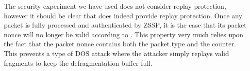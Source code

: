 \documentclass{article}
\begin{document}
The security experiment we have used does not consider replay protection, however it should be clear that  does indeed provide replay protection. Once any packet is fully processed and authenticated by ZSSP, it is the case that its packet nonce will no longer be valid according to . This property very much relies upon the fact that the packet nonce contains both the packet type and the counter. This prevents a type of DOS attack where the attacker simply replays valid fragments to keep the defragmentation buffer full.




\end{document}
